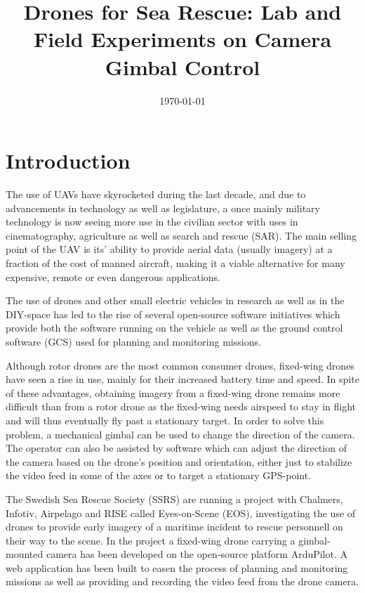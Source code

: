 \documentclass[nofilelist]{cslthse-msc}
\title{Drones for Sea Rescue: Lab and Field Experiments on Camera Gimbal Control}
\date{\today}
\begin{document}
\renewcommand{\bibname}{References}

\makefrontmatter


\chapter{Introduction}
The use of UAVs have skyrocketed during the last decade, and due to advancements in technology as well as legislature, a once mainly military technology is now seeing more use in the civilian sector with uses in cinematography, agriculture as well as search and rescue (SAR). The main selling point of the UAV is its' ability to provide aerial data (usually imagery) at a fraction of the cost of manned aircraft, making it a viable alternative for many expensive, remote or even dangerous applications.

The use of drones and other small electric vehicles in research as well as in the DIY-space has led to the rise of several open-source software initiatives which provide both the software running on the vehicle as well as the ground control software (GCS) used for planning and monitoring missions. 

Although rotor drones are the most common consumer drones, fixed-wing drones have seen a rise in use, mainly for their increased battery time and speed. In spite of these advantages, obtaining imagery from a fixed-wing drone remains more difficult than from a rotor drone as the fixed-wing needs airspeed to stay in flight and will thus eventually fly past a stationary target. In order to solve this problem, a mechanical gimbal can be used to change the direction of the camera. The operator can also be assisted by software which can adjust the direction of the camera based on the drone's position and orientation, either just to stabilize the video feed in some of the axes or to target a stationary GPS-point.

The Swedish Sea Rescue Society (SSRS) are running a project with Chalmers, Infotiv, Airpelago and RISE called Eyes-on-Scene (EOS), investigating the use of drones to provide early imagery of a maritime incident to rescue personnell on their way to the scene. In the project a fixed-wing drone carrying a gimbal-mounted camera has been developed on the open-source platform ArduPilot. A web application has been built to easen the process of planning and monitoring missions as well as providing and recording the video feed from the drone camera.
\end{document}

